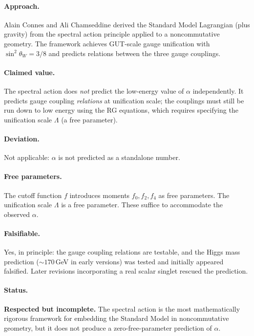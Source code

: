 \documentclass[11pt,a4paper]{article}
\begin{document}
\paragraph{Approach.}
Alain Connes and Ali Chamseddine derived the Standard Model Lagrangian (plus gravity) from the spectral action principle applied to a noncommutative geometry.  The framework achieves GUT-scale gauge unification with $\sin^2\theta_W = 3/8$ and predicts relations between the three gauge couplings.

\paragraph{Claimed value.}
The spectral action does \emph{not} predict the low-energy value of $\alpha$ independently.  It predicts gauge coupling \emph{relations} at unification scale; the couplings must still be run down to low energy using the RG equations, which requires specifying the unification scale $\Lambda$ (a free parameter).

\paragraph{Deviation.}
Not applicable: $\alpha$ is not predicted as a standalone number.

\paragraph{Free parameters.}
The cutoff function $f$ introduces moments $f_0, f_2, f_4$ as free parameters.  The unification scale $\Lambda$ is a free parameter.  These suffice to accommodate the observed $\alpha$.

\paragraph{Falsifiable.}
Yes, in principle: the gauge coupling relations are testable, and the Higgs mass prediction ($\sim 170$\,GeV in early versions) was tested and initially appeared falsified.  Later revisions incorporating a real scalar singlet rescued the prediction.

\paragraph{Status.}
\textbf{Respected but incomplete.}  The spectral action is the most mathematically rigorous framework for embedding the Standard Model in noncommutative geometry, but it does not produce a zero-free-parameter prediction of $\alpha$.
\end{document}
